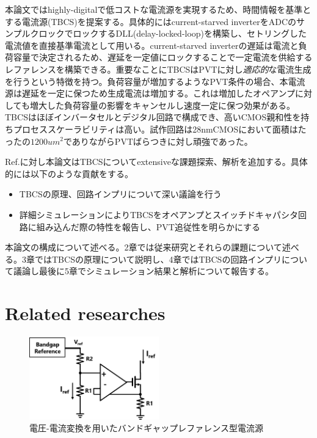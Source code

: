 \documentclass[letterpaper, 10 pt, conference]{ieeeconf}  %
\begin{document}
本論文ではhighly-digitalで低コストな電流源を実現するため、時間情報を基準とする電流源(TBCS)を提案する\cite{yoshioka201728}。具体的にはcurrent-starved inverterをADCのサンプルクロックでロックするDLL(delay-locked-loop)を構築し、セトリングした電流値を直接基準電流として用いる。current-starved inverterの遅延は電流と負荷容量で決定されるため、遅延を一定値にロックすることで一定電流を供給するレファレンスを構築できる。重要なことにTBCSはPVTに対し\textit{適応的}な電流生成を行うという特徴を持つ。負荷容量が増加するようなPVT条件の場合、本電流源は遅延を一定に保つため生成電流は増加する。これは増加したオペアンプに対しても増大した負荷容量の影響をキャンセルし速度一定に保つ効果がある。TBCSはほぼインバータセルとデジタル回路で構成でき、高いCMOS親和性を持ちプロセススケーラビリティは高い。試作回路は28nmCMOSにおいて面積はたったの$1200um^2$でありながらPVTばらつきに対し頑強であった。

Ref.\cite{yoshioka201728, yoshioka2019digital}に対し本論文はTBCSについてextensiveな課題探索、解析を追加する。具体的には以下のような貢献をする。
\begin{itemize}
\item TBCSの原理、回路インプリについて深い議論を行う
\item 詳細シミュレーションによりTBCSをオペアンプとスイッチドキャパシタ回路に組み込んだ際の特性を報告し、PVT追従性を明らかにする
\end{itemize}
本論文の構成について述べる。2章では従来研究とそれらの課題について述べる。3章ではTBCSの原理について説明し、4章ではTBCSの回路インプリについて議論し最後に5章でシミュレーション結果と解析について報告する。

\section{Related researches}
\begin{figure}[!]
\centering
 \includegraphics[width=0.5\textwidth]{figs/fig1.png}
  \caption{電圧-電流変換を用いたバンドギャップレファレンス型電流源}
\label{bandgap}
\end{figure}
\end{document}
